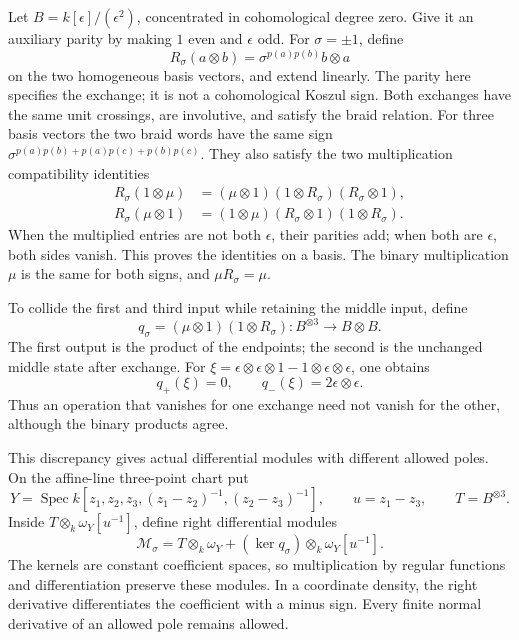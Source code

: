 Let \(B=k[\epsilon]/(\epsilon^2)\), concentrated in
cohomological degree zero. Give it an auxiliary parity by making
\(1\) even and \(\epsilon\) odd. For \(\sigma=\pm1\), define
\[
 R_\sigma(a\otimes b)=\sigma^{p(a)p(b)}b\otimes a
\]
on the two homogeneous basis vectors, and extend linearly.
The parity here specifies the exchange; it is not a
cohomological Koszul sign. Both exchanges have the same unit
crossings, are involutive, and satisfy the braid relation.
For three basis vectors the two braid words have the same sign
\(\sigma^{p(a)p(b)+p(a)p(c)+p(b)p(c)}\).
They also satisfy the two multiplication compatibility identities
\[
 \begin{split}
 R_\sigma(1\otimes\mu)
   &=(\mu\otimes1)(1\otimes R_\sigma)(R_\sigma\otimes1),\\
 R_\sigma(\mu\otimes1)
   &=(1\otimes\mu)(R_\sigma\otimes1)(1\otimes R_\sigma).
 \end{split}
\]
When the multiplied entries are not both \(\epsilon\), their
parities add; when both are \(\epsilon\), both sides vanish.
This proves the identities on a basis. The binary multiplication
\(\mu\) is the same for both signs, and \(\mu R_\sigma=\mu\).

To collide the first and third input while retaining the middle
input, define
\begin{equation}\label{v4-eq:recognition-outer-quotient}
 q_\sigma=(\mu\otimes1)(1\otimes R_\sigma):
              B^{\otimes3}\longrightarrow B\otimes B.
\end{equation}
The first output is the product of the endpoints; the second is
the unchanged middle state after exchange. For
\(\xi=\epsilon\otimes\epsilon\otimes1
          -1\otimes\epsilon\otimes\epsilon\), one obtains
\begin{equation}\label{v4-eq:recognition-spectator-witness}
 q_+(\xi)=0,\qquad q_-(\xi)=2\epsilon\otimes\epsilon.
\end{equation}
Thus an operation that vanishes for one exchange need not vanish
for the other, although the binary products agree.

This discrepancy gives actual differential modules with different
allowed poles. On the affine-line three-point chart put
\[
 Y=\operatorname{Spec}
 k[z_1,z_2,z_3,(z_1-z_2)^{-1},(z_2-z_3)^{-1}],
 \qquad u=z_1-z_3,\qquad T=B^{\otimes3}.
\]
Inside \(T\otimes_k\omega_Y[u^{-1}]\), define right
differential modules
\begin{equation}\label{v4-eq:recognition-polar-extensions}
 \mathcal M_\sigma
   =T\otimes_k\omega_Y
        +(\ker q_\sigma)\otimes_k\omega_Y[u^{-1}].
\end{equation}
The kernels are constant coefficient spaces, so multiplication
by regular functions and differentiation preserve these modules.
In a coordinate density, the right derivative differentiates
the coefficient with a minus sign. Every finite normal
derivative of an allowed pole remains allowed.

